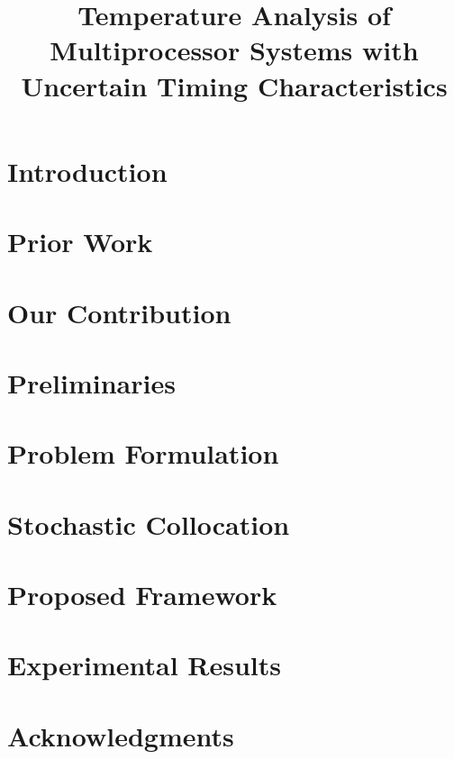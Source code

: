 \documentclass[journal]{IEEEtran}
\title{
  Temperature Analysis of Multiprocessor Systems
  with Uncertain Timing Characteristics
}
\author{}
\begin{document}
  \maketitle

  \begin{abstract}
    
  \end{abstract}


  \section{Introduction}
  

  \section{Prior Work}
  

  \section{Our Contribution}
  

  \section{Preliminaries}
  

  \section{Problem Formulation} 
  

  \section{Stochastic Collocation}
  

  \section{Proposed Framework}
  

  \section{Experimental Results}
  

  \section*{Acknowledgments}
  

  \begingroup
    
    
  \endgroup
\end{document}
